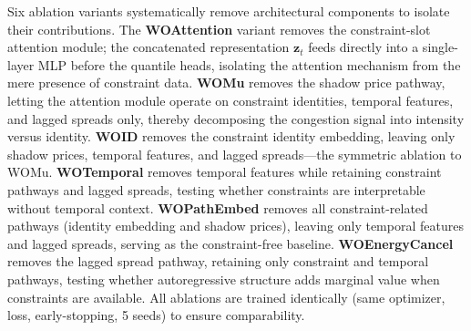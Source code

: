 Six ablation variants systematically remove architectural components to isolate their contributions. The \textbf{WOAttention} variant removes the constraint-slot attention module; the concatenated representation $\mathbf{z}_t$ feeds directly into a single-layer MLP before the quantile heads, isolating the attention mechanism from the mere presence of constraint data. \textbf{WOMu} removes the shadow price pathway, letting the attention module operate on constraint identities, temporal features, and lagged spreads only, thereby decomposing the congestion signal into intensity versus identity. \textbf{WOID} removes the constraint identity embedding, leaving only shadow prices, temporal features, and lagged spreads---the symmetric ablation to WOMu. \textbf{WOTemporal} removes temporal features while retaining constraint pathways and lagged spreads, testing whether constraints are interpretable without temporal context. \textbf{WOPathEmbed} removes all constraint-related pathways (identity embedding and shadow prices), leaving only temporal features and lagged spreads, serving as the constraint-free baseline. \textbf{WOEnergyCancel} removes the lagged spread pathway, retaining only constraint and temporal pathways, testing whether autoregressive structure adds marginal value when constraints are available. All ablations are trained identically (same optimizer, loss, early-stopping, 5 seeds) to ensure comparability.
